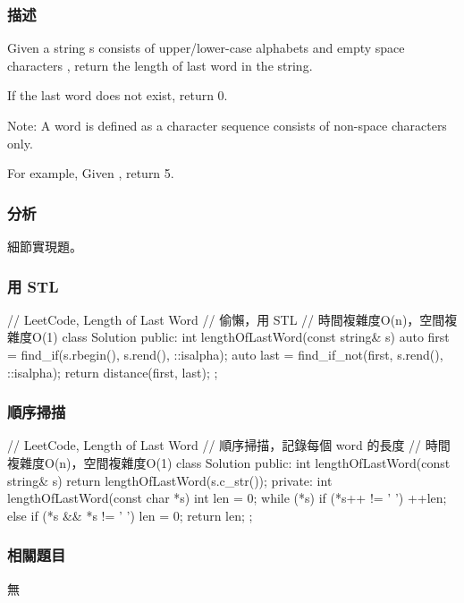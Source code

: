 \subsubsection{描述}
Given a string s consists of upper/lower-case alphabets and empty space characters , return the length of last word in the string.

If the last word does not exist, return 0.

Note: A word is defined as a character sequence consists of non-space characters only.

For example, 
Given ,
return 5.


\subsubsection{分析}
細節實現題。


\subsubsection{用 STL}
\begin{Code}
// LeetCode, Length of Last Word
// 偷懶，用 STL
// 時間複雜度O(n)，空間複雜度O(1)
class Solution {
public:
    int lengthOfLastWord(const string& s) {
        auto first = find_if(s.rbegin(), s.rend(), ::isalpha);
        auto last = find_if_not(first, s.rend(), ::isalpha);
        return distance(first, last);
    }
};
\end{Code}


\subsubsection{順序掃描}
\begin{Code}
// LeetCode, Length of Last Word
// 順序掃描，記錄每個 word 的長度
// 時間複雜度O(n)，空間複雜度O(1)
class Solution {
public:
    int lengthOfLastWord(const string& s) {
        return lengthOfLastWord(s.c_str());
    }
private:
    int lengthOfLastWord(const char *s) {
        int len = 0;
        while (*s) {
            if (*s++ != ' ')
                ++len;
            else if (*s && *s != ' ')
                len = 0;
        }
        return len;
    }
};
\end{Code}


\subsubsection{相關題目}
\begindot
\item 無
\myenddot

